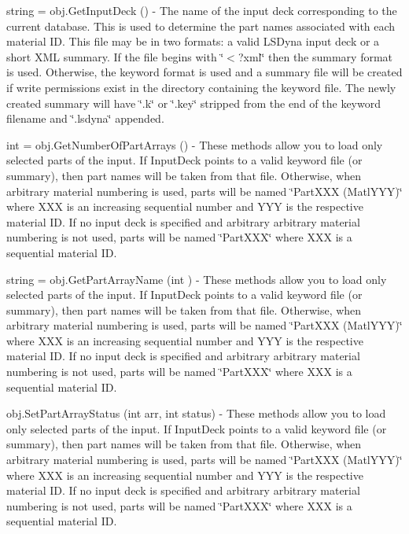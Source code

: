 \begin{DoxyItemize}
\item {\ttfamily string = obj.\-Get\-Input\-Deck ()} -\/ The name of the input deck corresponding to the current database. This is used to determine the part names associated with each material I\-D. This file may be in two formats\-: a valid L\-S\-Dyna input deck or a short X\-M\-L summary. If the file begins with \char`\"{}$<$?xml\char`\"{} then the summary format is used. Otherwise, the keyword format is used and a summary file will be created if write permissions exist in the directory containing the keyword file. The newly created summary will have \char`\"{}.\-k\char`\"{} or \char`\"{}.\-key\char`\"{} stripped from the end of the keyword filename and \char`\"{}.\-lsdyna\char`\"{} appended.  
\item {\ttfamily int = obj.\-Get\-Number\-Of\-Part\-Arrays ()} -\/ These methods allow you to load only selected parts of the input. If Input\-Deck points to a valid keyword file (or summary), then part names will be taken from that file. Otherwise, when arbitrary material numbering is used, parts will be named \char`\"{}\-Part\-X\-X\-X (\-Matl\-Y\-Y\-Y)\char`\"{} where X\-X\-X is an increasing sequential number and Y\-Y\-Y is the respective material I\-D. If no input deck is specified and arbitrary arbitrary material numbering is not used, parts will be named \char`\"{}\-Part\-X\-X\-X\char`\"{} where X\-X\-X is a sequential material I\-D.  
\item {\ttfamily string = obj.\-Get\-Part\-Array\-Name (int )} -\/ These methods allow you to load only selected parts of the input. If Input\-Deck points to a valid keyword file (or summary), then part names will be taken from that file. Otherwise, when arbitrary material numbering is used, parts will be named \char`\"{}\-Part\-X\-X\-X (\-Matl\-Y\-Y\-Y)\char`\"{} where X\-X\-X is an increasing sequential number and Y\-Y\-Y is the respective material I\-D. If no input deck is specified and arbitrary arbitrary material numbering is not used, parts will be named \char`\"{}\-Part\-X\-X\-X\char`\"{} where X\-X\-X is a sequential material I\-D.  
\item {\ttfamily obj.\-Set\-Part\-Array\-Status (int arr, int status)} -\/ These methods allow you to load only selected parts of the input. If Input\-Deck points to a valid keyword file (or summary), then part names will be taken from that file. Otherwise, when arbitrary material numbering is used, parts will be named \char`\"{}\-Part\-X\-X\-X (\-Matl\-Y\-Y\-Y)\char`\"{} where X\-X\-X is an increasing sequential number and Y\-Y\-Y is the respective material I\-D. If no input deck is specified and arbitrary arbitrary material numbering is not used, parts will be named \char`\"{}\-Part\-X\-X\-X\char`\"{} where X\-X\-X is a sequential material I\-D.  

\end{DoxyItemize}
